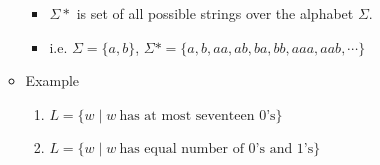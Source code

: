 \documentclass[12pt]{article}
\begin{document}
\begin{itemize}
\begin{itemize}
        \begin{itemize}
            \item  $\Sigma *$ is set of all possible strings over the alphabet $\Sigma$.
            \item i.e. $\Sigma = \{a,b\}$, $\Sigma* = \{a,b,aa,ab,ba,bb,aaa,aab,\cdots\}$
        \end{itemize}
        \item Example
        \begin{enumerate}[1.]
        \item $L = \{w \mid w\:\text{has at most seventeen 0's}\}$
        \item $L = \{w \mid w\:\text{has equal number of 0's and 1's}\}$
        \end{enumerate}
    \end{itemize}
\end{itemize}
\end{document}

